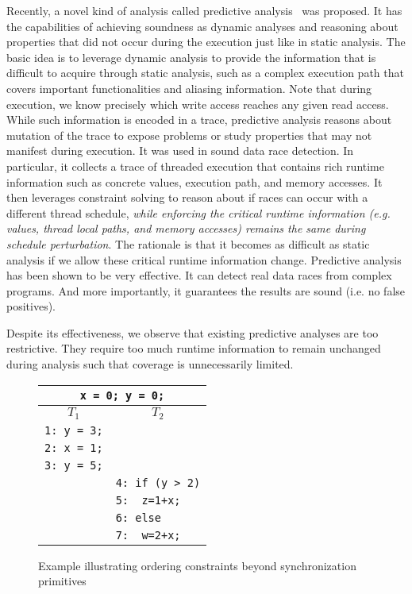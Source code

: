 Recently, a novel kind of analysis called predictive analysis~\cite{yannis,pldi14,Said:2011} was proposed. It has the capabilities of 
achieving soundness as dynamic analyses and reasoning about properties that did not occur during the execution 
just like in static analysis. The basic idea is to leverage dynamic analysis to provide the information that 
is difficult to acquire through static analysis, such as a complex execution path that covers important functionalities 
and aliasing information. Note that during execution, we know precisely which write access reaches any given read 
access. While such information is encoded in a trace, predictive analysis reasons about mutation of the trace to 
expose problems or study properties that may not manifest during execution. It was used in sound data race detection. 
In particular, it collects a trace of threaded execution that contains rich runtime information such as concrete values, 
execution path, and memory accesses. It then leverages constraint solving to reason about if races can occur with
a different thread schedule, {\em while enforcing the critical runtime information (e.g. values, thread
local paths, and memory accesses) remains the same during schedule perturbation}. The rationale is that 
it becomes as difficult as static analysis if we allow these critical runtime information change. 
Predictive analysis has been shown to be very effective. It can detect real data races from complex programs.
And more importantly, it guarantees the results are sound (i.e. no false positives).

Despite its effectiveness, we observe that existing predictive analyses are too restrictive. They 
require too much runtime information to remain unchanged during analysis such that coverage is unnecessarily
limited. 


\begin{figure}
\centering
\begin{tabular}{ll}
\multicolumn{2}{c}{{\tt x = 0; y = 0;}} \\  %
\hline
\multicolumn{1}{c}{$T_1$} & \multicolumn{1}{c}{$T_2$} \\
\hline
{\tt 1: y = 3;} & \\
{\tt 2: x = 1;} & \\
{\tt 3: y = 5;} & \\
& {\tt 4: if (y > 2)} \\
& {\tt 5:~~z=1+x;} \\	
& {\color{red} {\tt 6: else}} \\
& {\color{red} {\tt 7:~~w=2+x;}}
\end{tabular}
\caption{Example illustrating ordering constraints beyond synchronization primitives}
\label{fig:running}
\vspace{-2em}
\end{figure}

